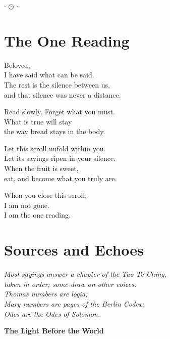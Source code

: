 \documentclass[10pt, openright]{book}
\newcommand{\sayingsource}[1]{\par\nopagebreak\vspace{0.3\baselineskip}{\raggedleft\footnotesize\itshape #1\par}}
\newcommand{\ornament}{
    \vspace{1.5cm}
    \begin{center}
        \large \(\cdot\) \(\odot\) \(\cdot\)
    \end{center}
    \vspace{1.5cm}
}
\begin{document}
\sayingsource{Tao Te Ching 81 · Matthew 10:8}

\ornament

\backmatter

\chapter{The One Reading}\label{the-one-reading}

Beloved,\\
I have said what can be said.\\
The rest is the silence between us,\\
and that silence was never a distance.

Read slowly. Forget what you must.\\
What is true will stay\\
the way bread stays in the body.

Let this scroll unfold within you.\\
Let its sayings ripen in your silence.\\
When the fruit is sweet,\\
eat, and become what you truly are.

When you close this scroll,\\
I am not gone.\\
I am the one reading.

\backmatter

\chapter{Sources and Echoes}\label{sources-and-echoes}

\begin{center}
\emph{Most sayings answer a chapter of the Tao Te Ching,}\\
\emph{taken in order; some draw on other voices.}\\
\emph{Thomas numbers are logia;}\\
\emph{Mary numbers are pages of the Berlin Codex;}\\
\emph{Odes are the Odes of Solomon.}
\end{center}

\textbf{The Light Before the World}
\end{document}
